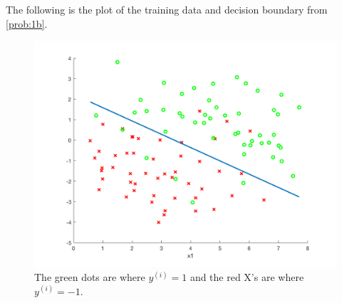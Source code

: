 \documentclass[11pt,a4paper,titlepage]{article}
\begin{document}
{\subsection{}{
\quad The following is the plot of the training data and decision boundary from \ref{prob:1b}.
\begin{figure}[h]
\centering
\includegraphics[width=6.5in]{ps1_1c}
\caption{The green dots are where $y^{(i)}=1$ and the red X's are where $y^{(i)}={-1}$.}
\end{figure}
}\label{prob:1c}
}\label{problem 1}
\end{document}
